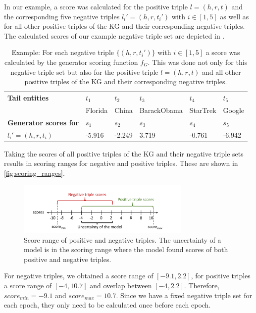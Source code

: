 In our example, a score was calculated for the positive triple $l = (h,r,t)$ and the corresponding five negative triples $l_i' = (h,r,t_i')$  with $i \in [1,5]$ as well as for all other positive triples of the \ac{KG} and their corresponding negative triples.
The calculated scores of our example negative triple set are depicted in .
\begin{table}[h]
    \centering
    \begin{tabular}{llllll}
        \toprule
        
        \textbf{Tail entities}
        & \textbf{$t_1$} & \textbf{$t_2$} & \textbf{$t_3$} & \textbf{$t_4$} & \textbf{$t_5$} \\
         
        & Florida
        & China
        & BarackObama
        & StarTrek
        & Google  \\

        \midrule
        
        \textbf{Generator scores for}
        & $s_1$ & $s_2$ & $s_3$ & $s_4$ & $s_5$ \\
       
        
        \textbf{$l_i' = (h, r, t_i)$}
        & -5.916 
        & -2.249  
        & 3.719 
        & -0.761 
        & -6.942\\ 
        
        \bottomrule
        
    \end{tabular}
    \caption{Example: For each negative triple
    $\{(h,r,t_i')\}$ with $i \in [1,5]$ a score was calculated by the generator scoring function $f_G$.
    This was done not only for this negative triple set but also for the positive triple $l = (h,r,t)$ and all other positive triples of the KG and their corresponding negative triples.}
\label{tab:generator_scores_of_neg}
\end{table}
Taking the scores of all positive triples of the \ac{KG} and their negative triple sets results in scoring ranges for negative and positive triples.
These are shown in \autoref{fig:scoring_ranges}.
\begin{figure}[H]
  \centering
    \includegraphics[width=0.75\textwidth]{figures/scoremin_scoremax_example.pdf}
  \caption{Score range of positive and negative triples.
  The uncertainty of a model is in the scoring range where the model found scores of both positive and negative triples.}
  \label{fig:scoring_ranges}
\end{figure}
For negative triples, we obtained a score range of $[-9.1, 2.2]$, for positive triples a score range of $[-4, 10.7]$ and overlap between $[-4, 2.2]$.
Therefore, $score_{min} = -9.1$ and $score_{max} = 10.7$.
Since we have a fixed negative triple set for each epoch, they only need to be calculated once before each epoch.